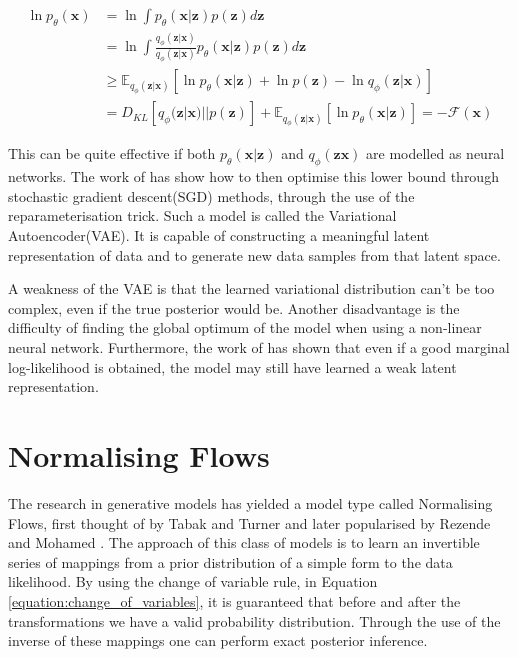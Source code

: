\documentclass{report}
\newcommand{\E}{\mathbb{E}}
\newcommand{\bx}{\mathbf{x}}
\newcommand{\bz}{\mathbf{z}}
\begin{document}
\begin{equation}\label{equation:negative_free_energy}
    \begin{split}
    \ln p_\theta(\bx) &= \ln \int p_\theta(\bx|\bz)p(\bz) d\bz\\
    &= \ln \int \frac{q_\phi(\bz|\bx)}{q_\phi(\bz|\bx)} p_\theta(\bx|\bz)p(\bz)d\bz\\
    &\geq \E_{q_\phi(\bz|\bx)}[\ln p_\theta(\bx|\bz) + \ln p(\bz) - \ln q_\phi(\bz|\bx)] \\
    &= D_{KL}[q_\phi(\bz|\bx) || p(\bz)] + \E_{q_\phi(\bz|\bx)}[\ln p_\theta(\bx|\bz)]= -\mathcal{F}(\bx)
    \end{split}
\end{equation}

This can be quite effective if both $p_\theta(\bx|\bz)$ and $q_\phi(\bz\bx)$ are modelled as neural networks. The work of \cite{kingma2013auto} has show how to then optimise this lower bound through stochastic gradient descent(SGD) methods, through the use of the reparameterisation trick. Such a model is called the Variational Autoencoder(VAE). It is capable of constructing a meaningful latent representation of data and to generate new data samples from that latent space. 

A weakness of the VAE is that the learned variational distribution can't be too complex, even if the true posterior would be. Another disadvantage is the difficulty of finding the global optimum of the model when using a non-linear neural network. Furthermore, the work of \cite{alemi2017fixing} has shown that even if a good marginal log-likelihood is obtained, the model may still have learned a weak latent representation.

\section{Normalising Flows}
The research in generative models has yielded a model type called Normalising Flows, first thought of by Tabak and Turner \cite{tabak2013family} and later popularised by Rezende and Mohamed \cite{rezende2016variational}. The approach of this class of models is to learn an invertible series of mappings from a prior distribution of a simple form to the data likelihood. By using the change of variable rule, in Equation \ref{equation:change_of_variables}, it is guaranteed that before and after the transformations we have a valid probability distribution. Through the use of the inverse of these mappings one can perform exact posterior inference. 
\end{document}
